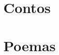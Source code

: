 \documentclass[11pt,openany]{book}
\begin{document}
\frontmatter


\tableofcontents

\mainmatter
\pagestyle{fancy}

\part{Contos}


\part{Poemas}


\backmatter

\end{document}
